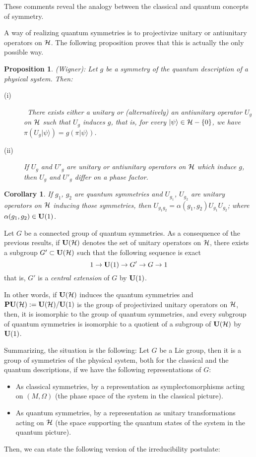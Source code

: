 \documentclass[12pt]{article}
\newtheorem{prop}{Proposition}
\newtheorem{corol}{Corollary}
\def\H{{\cal H}}
\def\sta{|\psi \rangle }
\begin{document}
These comments reveal the analogy between the classical and
quantum concepts of symmetry.

A way of realizing quantum symmetries
is to projectivize unitary or antiunitary operators on $\H$.
The following proposition proves that this is actually the only possible
way.

\begin{prop}
{\rm (Wigner):}
Let $g$ be a symmetry of the quantum description of a physical system.
Then:
\begin{description}
\item[{\rm (i)}] \
There exists either a unitary or (alternatively) an antiunitary
operator $U_g$ on $\H$ such that $U_g$ induces $g$, that is, for
every $\sta \in \H -\{ 0 \}$, we have $\pi(U_g\sta ) = g(\pi \sta
)$.
\item[{\rm (ii)}]
If $U_g$ and $U'_g$ are unitary or antiunitary operators
on $\H$ which induce $g$, then $U_g$ and $U'_g$ differ on a phase
factor.
\end{description}
\label{sg}
\end{prop}

\begin{corol}
If $g_1$, $g_2$ are quantum symmetries and
$U_{g_1}$, $U_{g_2}$ are unitary operators on $\H$
inducing those symmetries, then
$U_{g_1g_2}=\alpha (g_1,g_2)U_{g_1}U_{g_2}$;
where $\alpha (g_1,g_2) \in {\bf U}(1)$.
\end{corol}

Let $G$ be a connected group of quantum symmetries.
As a consequence of the previous results, if ${\bf U}(\H )$ denotes
the set of unitary operators on $\H$, there exists a subgroup
$G'\subset {\bf U}(\H )$ such that the following sequence is exact
$$
1 \to {\bf U}(1) \to G' \to G \to 1
$$
that is, $G'$ is a {\it central extension} of $G$ by ${\bf U}(1)$.

In other words, if ${\bf U}(\H )$ induces the quantum symmetries
and ${\bf PU}(\H ):={\bf U}(\H )/{\bf U}(1)$ is the group of
projectivized
unitary operators on $\H$, then, it is isomorphic to the group of
quantum symmetries, and every subgroup of quantum symmetries
is isomorphic to a quotient of a subgroup of ${\bf U}(\H )$ by ${\bf
U}(1)$.

Summarizing, the situation is the following:
Let $G$ be a Lie group, then it is a group of symmetries of the
physical system, both for the classical and the quantum descriptions,
if we have the following representations of $G$:
\begin{itemize}
\item
As classical symmetries, by a representation as symplectomorphisms
acting on $(M,\Omega )$ (the phase space of the system in the classical
picture).
\item
As quantum symmetries, by a representation as unitary transformations
acting on $\H$
(the space supporting the quantum states of the system in the quantum
picture).
\end{itemize}
Then, we can state the following version of the
irreducibility postulate:
\end{document}
